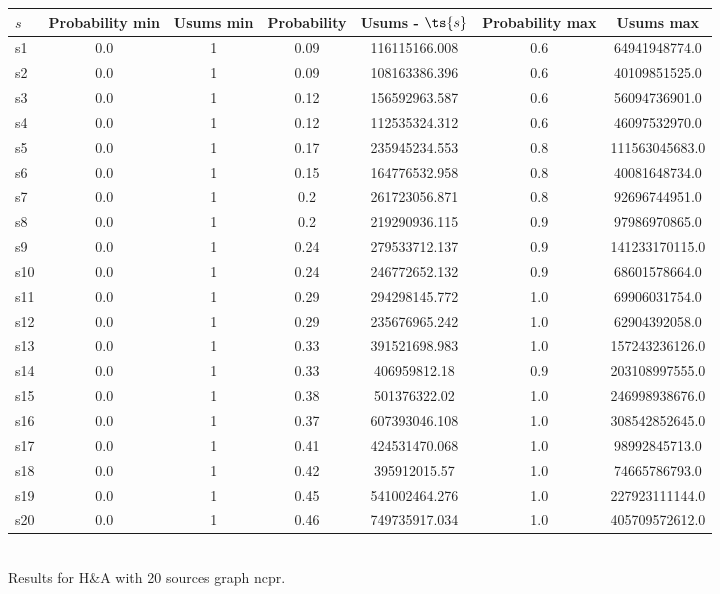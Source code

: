 \documentclass{article}
\begin{document}
\noindent\begin{tabular}{|l|c|c|c|c|c|c|}
\hline
$s$& Probability min & Usums min & Probability & Usums - $\ts{s}$ & Probability max & Usums max\\
\hline
s1 &0.0 & 1 & 0.09 & 116115166.008 & 0.6 & 64941948774.0\\
\hline
s2 &0.0 & 1 & 0.09 & 108163386.396 & 0.6 & 40109851525.0\\
\hline
s3 &0.0 & 1 & 0.12 & 156592963.587 & 0.6 & 56094736901.0\\
\hline
s4 &0.0 & 1 & 0.12 & 112535324.312 & 0.6 & 46097532970.0\\
\hline
s5 &0.0 & 1 & 0.17 & 235945234.553 & 0.8 & 111563045683.0\\
\hline
s6 &0.0 & 1 & 0.15 & 164776532.958 & 0.8 & 40081648734.0\\
\hline
s7 &0.0 & 1 & 0.2 & 261723056.871 & 0.8 & 92696744951.0\\
\hline
s8 &0.0 & 1 & 0.2 & 219290936.115 & 0.9 & 97986970865.0\\
\hline
s9 &0.0 & 1 & 0.24 & 279533712.137 & 0.9 & 141233170115.0\\
\hline
s10 &0.0 & 1 & 0.24 & 246772652.132 & 0.9 & 68601578664.0\\
\hline
s11 &0.0 & 1 & 0.29 & 294298145.772 & 1.0 & 69906031754.0\\
\hline
s12 &0.0 & 1 & 0.29 & 235676965.242 & 1.0 & 62904392058.0\\
\hline
s13 &0.0 & 1 & 0.33 & 391521698.983 & 1.0 & 157243236126.0\\
\hline
s14 &0.0 & 1 & 0.33 & 406959812.18 & 0.9 & 203108997555.0\\
\hline
s15 &0.0 & 1 & 0.38 & 501376322.02 & 1.0 & 246998938676.0\\
\hline
s16 &0.0 & 1 & 0.37 & 607393046.108 & 1.0 & 308542852645.0\\
\hline
s17 &0.0 & 1 & 0.41 & 424531470.068 & 1.0 & 98992845713.0\\
\hline
s18 &0.0 & 1 & 0.42 & 395912015.57 & 1.0 & 74665786793.0\\
\hline
s19 &0.0 & 1 & 0.45 & 541002464.276 & 1.0 & 227923111144.0\\
\hline
s20 &0.0 & 1 & 0.46 & 749735917.034 & 1.0 & 405709572612.0\\
\hline
\end{tabular}\\

\noindent Results for H\&A with 20 sources graph ncpr.
\end{document}
